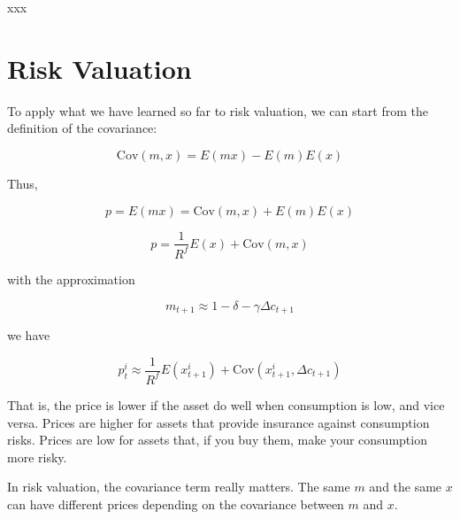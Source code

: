 \begin{tcolorbox}[colback=white, colframe=black, title=Example X]
    xxx
\end{tcolorbox}

\section{Risk Valuation}

To apply what we have learned so far to risk valuation, we can start
from the definition of the covariance:

\begin{equation}
    \text{Cov}(m, x) = E(mx) - E(m)E(x)
\end{equation}

Thus,

\begin{equation}
    p = E(mx) = \text{Cov}(m, x) + E(m)E(x)
\end{equation}

\begin{equation}
    p = \frac{1}{R^f} E(x) + \text{Cov}(m, x)
\end{equation}

with the approximation

\begin{equation}
    m_{t+1} \approx 1 - \delta - \gamma \Delta c_{t+1}
\end{equation}

we have

\begin{equation}
p^i_t \approx \frac{1}{R^f} E(x^i_{t+1}) + \text{Cov}(x^i_{t+1}, \Delta c_{t+1})
\end{equation}

That is, the price is lower if the asset do well 
when consumption is low, and vice versa. Prices are higher 
for assets that provide insurance against consumption risks.
Prices are low for assets that, if you buy them, make your consumption
more risky. 

In risk valuation, the covariance term really matters. 
The same $m$ and the same $x$ can have different prices depending on the covariance between
$m$ and $x$. 

